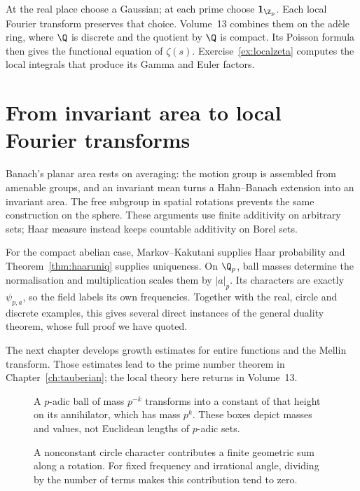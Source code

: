 \begin{beauty}
At the real place choose a Gaussian; at each prime choose $\mathbf1_{\Z_p}$. Each local Fourier transform preserves that choice. Volume~13 combines them on the adèle ring, where $\Q$ is discrete and the quotient by $\Q$ is compact. Its Poisson formula then gives the functional equation of $\zeta(s)$. Exercise~\ref{ex:localzeta} computes the local integrals that produce its Gamma and Euler factors.
\end{beauty}

\section{From invariant area to local Fourier transforms}

Banach's planar area rests on averaging: the motion group is assembled from amenable groups, and an invariant mean turns a Hahn--Banach extension into an invariant area. The free subgroup in spatial rotations prevents the same construction on the sphere. These arguments use finite additivity on arbitrary sets; Haar measure instead keeps countable additivity on Borel sets.

For the compact abelian case, Markov--Kakutani supplies Haar probability and Theorem~\ref{thm:haaruniq} supplies uniqueness. On $\Q_p$, ball masses determine the normalisation and multiplication scales them by $|a|_p$. Its characters are exactly $\psi_{p,a}$, so the field labels its own frequencies. Together with the real, circle and discrete examples, this gives several direct instances of the general duality theorem, whose full proof we have quoted.

The next chapter develops growth estimates for entire functions and the Mellin transform. Those estimates lead to the prime number theorem in Chapter~\ref{ch:tauberian}; the local theory here returns in Volume~13.

\begin{figure}[ht]
\centering{}
\caption{A $p$-adic ball of mass $p^{-k}$ transforms into a constant of that height on its annihilator, which has mass $p^k$. These boxes depict masses and values, not Euclidean lengths of $p$-adic sets.}
\label{fig:v8c13balls}
\end{figure}
\begin{figure}[ht]
\centering{}
\caption{A nonconstant circle character contributes a finite geometric sum along a rotation. For fixed frequency and irrational angle, dividing by the number of terms makes this contribution tend to zero.}
\label{fig:v8c13average}
\end{figure}
